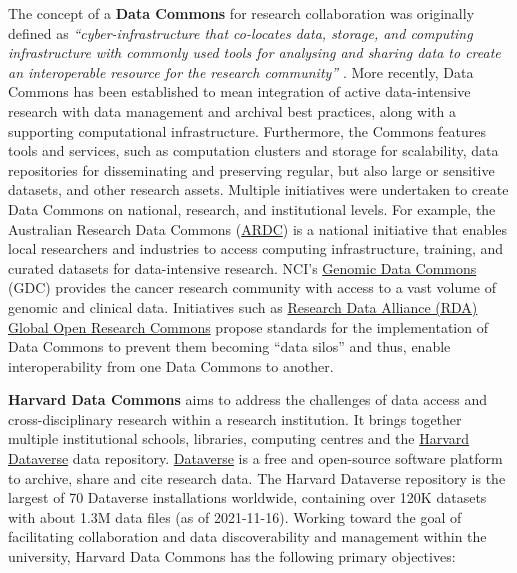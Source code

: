 {The concept of a \textbf{Data Commons} for research collaboration was
originally defined as \emph{``cyber-infrastructure that co-locates data,
storage, and computing infrastructure with commonly used tools for
analysing and sharing data to create an interoperable resource for the
research community''}
\cite{ch5-59}. More recently,
Data Commons has been established to mean integration of active
data-intensive research with data management and archival best
practices, along with a supporting computational infrastructure.
Furthermore, the Commons features tools and services, such as
computation clusters and storage for scalability, data repositories for
disseminating and preserving regular, but also large or sensitive
datasets, and other research assets. Multiple initiatives were
undertaken to create Data Commons on national, research, and
institutional levels. For example, the Australian Research Data Commons
(\href{https://ardc.edu.au}{ARDC})
\cite{Barker 2019} is a national
initiative that enables local researchers and industries to access
computing infrastructure, training, and curated datasets for
data-intensive research. NCI's \href{https://gdc.cancer.gov/}{Genomic
Data Commons} (GDC)
\cite{ch5-65} provides
the cancer research community with access to a vast volume of genomic
and clinical data. Initiatives such as
\href{https://www.rd-alliance.org/groups/global-open-research-commons-ig}{Research
Data Alliance (RDA) Global Open Research Commons} propose standards for
the implementation of Data Commons to prevent them becoming ``data
silos'' and thus, enable interoperability from one Data Commons to
another.

\textbf{Harvard Data Commons}
\cite{Crosas 2020} aims to address the
challenges of data access and cross-disciplinary research within a
research institution. It brings together multiple institutional schools,
libraries, computing centres and the
\href{https://dataverse.harvard.edu/}{Harvard Dataverse} data
repository. \href{https://dataverse.org/}{Dataverse}
\cite{Crosas 2011} is a free
and open-source software platform to archive, share and cite research
data. The Harvard Dataverse repository is the largest of 70 Dataverse
installations worldwide, containing over 120K datasets with about 1.3M
data files (as of 2021-11-16). Working toward the goal of facilitating
collaboration and data discoverability and management within the
university, Harvard Data Commons has the following primary objectives:

}
